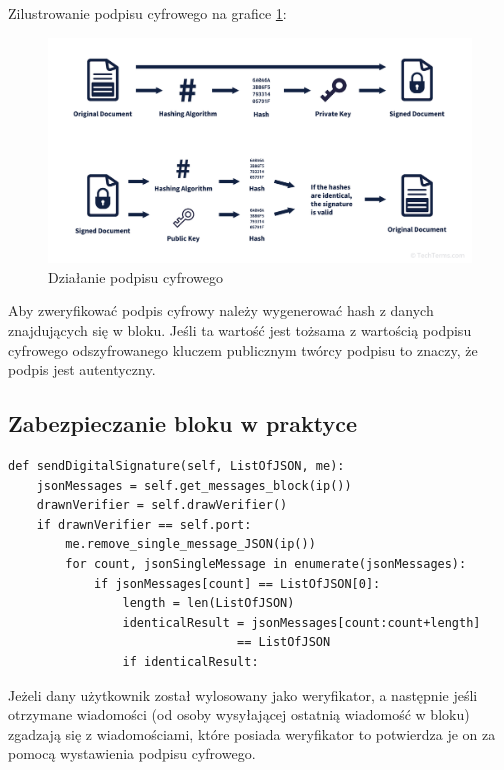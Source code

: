 Zilustrowanie podpisu cyfrowego na grafice \ref{fig:DSJP}:
\begin{figure}[H]
    \centering
    \includegraphics[width=\textwidth]{Images/DSJPG.jpg}
    \caption{Działanie podpisu cyfrowego}
    \label{fig:DSJP}
\end{figure}

Aby zweryfikować podpis cyfrowy należy wygenerować hash z danych znajdujących się w bloku. Jeśli ta wartość jest tożsama z wartością podpisu cyfrowego odszyfrowanego kluczem publicznym twórcy podpisu to znaczy, że podpis jest autentyczny.

\subsection{Zabezpieczanie bloku w praktyce}

\begin{lstlisting}
def sendDigitalSignature(self, ListOfJSON, me):
    jsonMessages = self.get_messages_block(ip())
    drawnVerifier = self.drawVerifier()
    if drawnVerifier == self.port:
        me.remove_single_message_JSON(ip())
        for count, jsonSingleMessage in enumerate(jsonMessages):
            if jsonMessages[count] == ListOfJSON[0]:
                length = len(ListOfJSON)
                identicalResult = jsonMessages[count:count+length]
                                == ListOfJSON
                if identicalResult:
\end{lstlisting}
Jeżeli dany użytkownik został wylosowany jako weryfikator, a następnie jeśli otrzymane wiadomości (od osoby wysyłającej ostatnią wiadomość w bloku) zgadzają się z wiadomościami, które posiada weryfikator to potwierdza je on za pomocą wystawienia podpisu cyfrowego.

